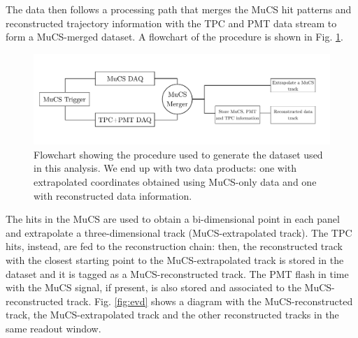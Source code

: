 \documentclass[a4paper]{scrartcl}
\begin{document}
The data then follows a processing path that merges the MuCS hit patterns and reconstructed trajectory information with the TPC and PMT data stream to form a MuCS-merged dataset. A flowchart of the procedure is shown in Fig. \ref{fig:scheme}.

\begin{figure}[htbp]
  \includegraphics[width=\linewidth]{figures/scheme.pdf}
  \caption{Flowchart showing the procedure used to generate the dataset used in this analysis. We end up with two data products: one with extrapolated coordinates obtained using MuCS-only data and one with reconstructed data information.} \label{fig:scheme}
\end{figure}

The hits in the MuCS are used to obtain a bi-dimensional point in each panel and extrapolate a three-dimensional track (MuCS-extrapolated track). The TPC hits, instead, are fed to the reconstruction chain: then, the reconstructed track with the closest starting point to the MuCS-extrapolated track is stored in the dataset and it is tagged as a MuCS-reconstructed track. The PMT flash in time with the MuCS signal, if present, is also stored and associated to the MuCS-reconstructed track.  Fig. \ref{fig:evd} shows a diagram with the MuCS-reconstructed track, the MuCS-extrapolated track and the other reconstructed tracks in the same readout window.
\end{document}

